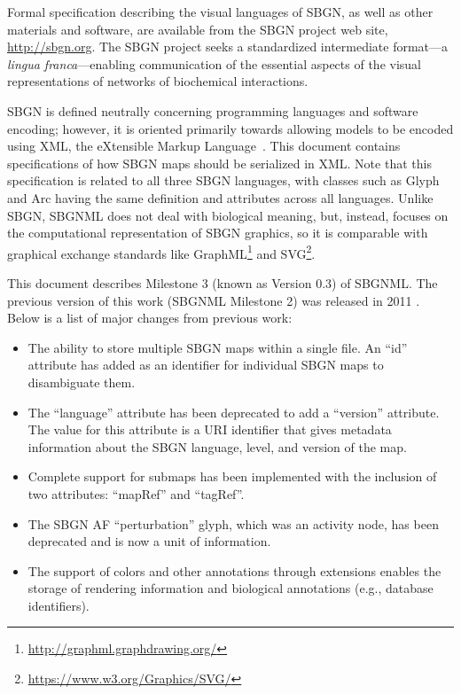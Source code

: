 Formal specification describing the visual languages of SBGN, as well as other materials and software, are available from the SBGN project web site, \url{http://sbgn.org}. The SBGN project seeks a standardized intermediate format---a \emph{lingua franca}---enabling communication of the essential aspects of the visual representations of networks of biochemical interactions.

SBGN is defined neutrally concerning programming languages and software encoding; however, it is oriented primarily towards allowing models to be encoded using XML, the eXtensible Markup Language~\citep{bray:2004}. This document contains specifications of how SBGN maps should be serialized in XML. Note that this specification is related to all three SBGN languages, with classes such as Glyph and Arc having the same definition and attributes across all languages. Unlike SBGN, SBGNML does not deal with biological meaning, but, instead, focuses on the computational representation of SBGN graphics, so it is comparable with graphical exchange standards like GraphML\footnote{\url{http://graphml.graphdrawing.org/}} and SVG\footnote{\url{https://www.w3.org/Graphics/SVG/}}.

This document describes Milestone 3 (known as Version 0.3) of SBGNML. The previous version of this work (SBGNML Milestone 2) was released in 2011 \citep{Iersel2012}. Below is a list of major changes from previous work:

\begin{itemize}
  \item The ability to store multiple SBGN maps within a single file. An ``id'' attribute has added as an identifier for individual SBGN maps to disambiguate them.
  \item The ``language'' attribute has been deprecated to add a ``version'' attribute. The value for this attribute is a URI identifier that gives metadata information about the SBGN language, level, and version of the map.
  \item Complete support for submaps has been implemented with the inclusion of two attributes: ``mapRef'' and ``tagRef''.
  \item The SBGN AF ``perturbation'' glyph, which was an activity node, has been deprecated and is now a unit of information.
  \item The support of colors and other annotations through extensions enables the storage of rendering information and biological annotations (e.g., database identifiers).
\end{itemize}

